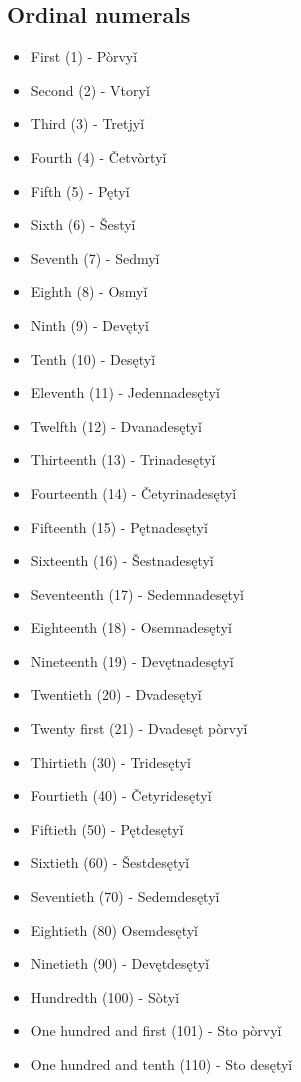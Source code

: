 \subsection{Ordinal numerals}

\begin{itemize}
	\item First (1) - Pòrvyǐ
	\item Second (2) - Vtoryǐ
	\item Third (3) - Tretjyǐ
	\item Fourth (4) - Četvòrtyǐ
	\item Fifth (5) - Pętyǐ
	\item Sixth (6) - Šestyǐ
	\item Seventh (7) - Sedmyǐ
	\item Eighth (8) - Osmyǐ
	\item Ninth (9) - Devętyǐ
	\item Tenth (10) - Desętyǐ
	\item Eleventh (11) - Jedennadesętyǐ
	\item Twelfth (12) - Dvanadesętyǐ
	\item Thirteenth (13) - Trinadesętyǐ
	\item Fourteenth (14) - Četyrinadesętyǐ
	\item Fifteenth (15) - Pętnadesętyǐ
	\item Sixteenth (16) - Šestnadesętyǐ
	\item Seventeenth (17) - Sedemnadesętyǐ
	\item Eighteenth (18) - Osemnadesętyǐ
	\item Nineteenth (19) - Devętnadesętyǐ
	\item Twentieth (20) - Dvadesętyǐ
	\item Twenty first (21) - Dvadesęt pòrvyǐ
	\item Thirtieth (30) - Tridesętyǐ
	\item Fourtieth (40) - Četyridesętyǐ
	\item Fiftieth (50) - Pętdesętyǐ
	\item Sixtieth (60) - Šestdesętyǐ
	\item Seventieth (70) - Sedemdesętyǐ
	\item Eightieth (80) Osemdesętyǐ
	\item Ninetieth (90) - Devętdesętyǐ
	\item Hundredth (100) - Sòtyǐ
	\item One hundred and first (101) - Sto pòrvyǐ
	\item One hundred and tenth (110) - Sto desętyǐ

\end{itemize}
